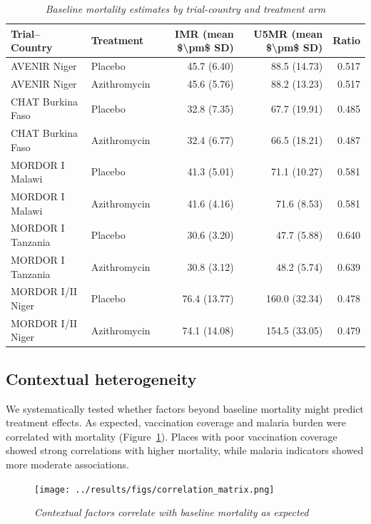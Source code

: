 \documentclass[11pt]{article}\usepackage[]{graphicx}\usepackage[]{xcolor}
\begin{document}
\linespread{1.2}
\begin{table}

\caption{\label{tab:tab:agedem}\emph{Baseline mortality estimates by trial-country and treatment arm}}
\centering
\begin{tabular}[t]{llrrr}
\toprule
Trial--Country & Treatment & IMR (mean \$\textbackslash{}pm\$ SD) & U5MR (mean \$\textbackslash{}pm\$ SD) & Ratio\\
\midrule
AVENIR Niger & Placebo & 45.7 (6.40) & 88.5 (14.73) & 0.517\\
AVENIR Niger & Azithromycin & 45.6 (5.76) & 88.2 (13.23) & 0.517\\
\midrule
CHAT Burkina Faso & Placebo & 32.8 (7.35) & 67.7 (19.91) & 0.485\\
CHAT Burkina Faso & Azithromycin & 32.4 (6.77) & 66.5 (18.21) & 0.487\\
\midrule
MORDOR I Malawi & Placebo & 41.3 (5.01) & 71.1 (10.27) & 0.581\\
MORDOR I Malawi & Azithromycin & 41.6 (4.16) & 71.6 (8.53) & 0.581\\
\midrule
MORDOR I Tanzania & Placebo & 30.6 (3.20) & 47.7 (5.88) & 0.640\\
MORDOR I Tanzania & Azithromycin & 30.8 (3.12) & 48.2 (5.74) & 0.639\\
\midrule
MORDOR I/II Niger & Placebo & 76.4 (13.77) & 160.0 (32.34) & 0.478\\
MORDOR I/II Niger & Azithromycin & 74.1 (14.08) & 154.5 (33.05) & 0.479\\
\bottomrule
\end{tabular}
\end{table}


\linespread{1.5}

\subsection{Contextual heterogeneity}

We systematically tested whether factors beyond baseline mortality might predict treatment effects. As expected, vaccination coverage and malaria burden were correlated with mortality (Figure~\ref{fig:correlation-matrix}). Places with poor vaccination coverage showed strong correlations with higher mortality, while malaria indicators showed more moderate associations.

\begin{figure}[!h]
\centering
\texttt{[image: ../results/figs/correlation\_matrix.png]}
\caption{\emph{Contextual factors correlate with baseline mortality as expected}}
\label{fig:correlation-matrix}
\end{figure}
\end{document}
